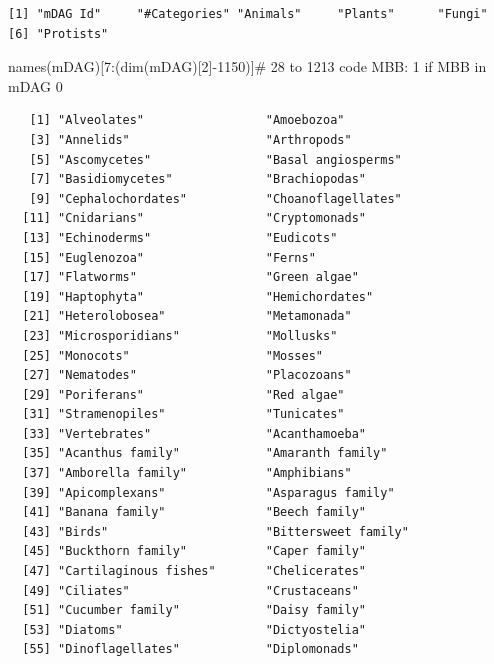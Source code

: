 \documentclass[
  letterpaper,
  DIV=11,
  numbers=noendperiod]{scrreprt}
\newenvironment{Shaded}{\begin{snugshade}}{\end{snugshade}}
\newcommand{\CommentTok}[1]{\textcolor[rgb]{0.37,0.37,0.37}{#1}}
\newcommand{\DecValTok}[1]{\textcolor[rgb]{0.68,0.00,0.00}{#1}}
\newcommand{\FunctionTok}[1]{\textcolor[rgb]{0.28,0.35,0.67}{#1}}
\newcommand{\NormalTok}[1]{\textcolor[rgb]{0.00,0.23,0.31}{#1}}
\newcommand{\SpecialCharTok}[1]{\textcolor[rgb]{0.37,0.37,0.37}{#1}}
\begin{document}
\begin{verbatim}
[1] "mDAG Id"     "#Categories" "Animals"     "Plants"      "Fungi"      
[6] "Protists"   
\end{verbatim}

\begin{Shaded}
\begin{Highlighting}[]
\FunctionTok{names}\NormalTok{(mDAG)[}\DecValTok{7}\SpecialCharTok{:}\NormalTok{(}\FunctionTok{dim}\NormalTok{(mDAG)[}\DecValTok{2}\NormalTok{]}\SpecialCharTok{{-}}\DecValTok{1150}\NormalTok{)]}\CommentTok{\# 28 to 1213  code MBB: 1 if MBB in mDAG 0 }
\end{Highlighting}
\end{Shaded}

\begin{verbatim}
   [1] "Alveolates"                 "Amoebozoa"                 
   [3] "Annelids"                   "Arthropods"                
   [5] "Ascomycetes"                "Basal angiosperms"         
   [7] "Basidiomycetes"             "Brachiopodas"              
   [9] "Cephalochordates"           "Choanoflagellates"         
  [11] "Cnidarians"                 "Cryptomonads"              
  [13] "Echinoderms"                "Eudicots"                  
  [15] "Euglenozoa"                 "Ferns"                     
  [17] "Flatworms"                  "Green algae"               
  [19] "Haptophyta"                 "Hemichordates"             
  [21] "Heterolobosea"              "Metamonada"                
  [23] "Microsporidians"            "Mollusks"                  
  [25] "Monocots"                   "Mosses"                    
  [27] "Nematodes"                  "Placozoans"                
  [29] "Poriferans"                 "Red algae"                 
  [31] "Stramenopiles"              "Tunicates"                 
  [33] "Vertebrates"                "Acanthamoeba"              
  [35] "Acanthus family"            "Amaranth family"           
  [37] "Amborella family"           "Amphibians"                
  [39] "Apicomplexans"              "Asparagus family"          
  [41] "Banana family"              "Beech family"              
  [43] "Birds"                      "Bittersweet family"        
  [45] "Buckthorn family"           "Caper family"              
  [47] "Cartilaginous fishes"       "Chelicerates"              
  [49] "Ciliates"                   "Crustaceans"               
  [51] "Cucumber family"            "Daisy family"              
  [53] "Diatoms"                    "Dictyostelia"              
  [55] "Dinoflagellates"            "Diplomonads"               

\end{verbatim}
\end{document}
